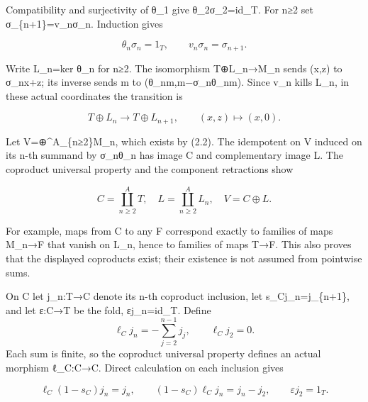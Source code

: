 \documentclass[11pt]{article}
\begin{document}
Compatibility and surjectivity of θ\_\allowbreak{}1 give θ\_\allowbreak{}2σ\_\allowbreak{}2\allowbreak{}=id\_\allowbreak{}T. For n≥2 set σ\_\allowbreak{}\{n\allowbreak{}+1\}\allowbreak{}=v\_\allowbreak{}nσ\_\allowbreak{}n. Induction gives

\[
 \theta_n\sigma_n=1_T,\qquad v_n\sigma_n=\sigma_{n+1}.
\]

Write L\_\allowbreak{}n\allowbreak{}=ker θ\_\allowbreak{}n for n≥2. The isomorphism T\allowbreak{}⊕L\_\allowbreak{}n\allowbreak{}→M\_\allowbreak{}n sends (x,\allowbreak{}z)\allowbreak{} to σ\_\allowbreak{}nx\allowbreak{}+z; its inverse sends m to (θ\_\allowbreak{}nm,\allowbreak{}m−σ\_\allowbreak{}nθ\_\allowbreak{}nm)\allowbreak{}. Since v\_\allowbreak{}n kills L\_\allowbreak{}n,\allowbreak{} in these actual coordinates the transition is

\[
 T\oplus L_n\longrightarrow T\oplus L_{n+1},
       \qquad (x,z)\longmapsto(x,0). \tag{3.1}
\]

Let V\allowbreak{}=\allowbreak{}⊕\textasciicircum{}A\_\allowbreak{}\{n≥2\}M\_\allowbreak{}n,\allowbreak{} which exists by (2.2)\allowbreak{}. The idempotent on V induced on its n-th summand by σ\_\allowbreak{}nθ\_\allowbreak{}n has image C and complementary image L. The coproduct universal property and the component retractions show

\[
 C=\coprod_{n\ge2}^{A}T,\quad
 L=\coprod_{n\ge2}^{A}L_n,\quad V=C\oplus L.
\]

For example,\allowbreak{} maps from C to any F correspond exactly to families of maps M\_\allowbreak{}n\allowbreak{}→F that vanish on L\_\allowbreak{}n,\allowbreak{} hence to families of maps T\allowbreak{}→F. This also proves that the displayed coproducts exist; their existence is not assumed from pointwise sums.

On C let j\_\allowbreak{}n:\allowbreak{}T\allowbreak{}→C denote its n-th coproduct inclusion,\allowbreak{} let s\_\allowbreak{}Cj\_\allowbreak{}n\allowbreak{}=j\_\allowbreak{}\{n\allowbreak{}+1\},\allowbreak{} and let ε:\allowbreak{}C\allowbreak{}→T be the fold,\allowbreak{} εj\_\allowbreak{}n\allowbreak{}=id\_\allowbreak{}T. Define \[
 \ell_Cj_n=-\sum_{j=2}^{n-1}j_j,\qquad
 \ell_Cj_2=0.
\] Each sum is finite,\allowbreak{} so the coproduct universal property defines an actual morphism ℓ\_\allowbreak{}C:\allowbreak{}C\allowbreak{}→C. Direct calculation on each inclusion gives

\[
 \ell_C(1-s_C)j_n=j_n,\qquad
 (1-s_C)\ell_Cj_n=j_n-j_2,\qquad \varepsilon j_2=1_T.
\]
\end{document}
